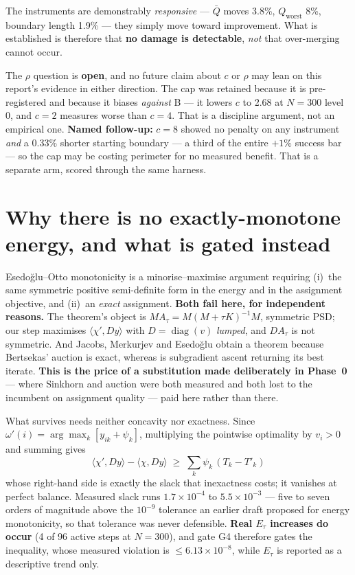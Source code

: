 \documentclass[11pt,a4paper]{article}
\begin{document}
The instruments are demonstrably \emph{responsive} --- \(\bar{Q}\) moves 3.8\%,
\(Q_{\mathrm{worst}}\) 8\%, boundary length 1.9\% --- they simply move toward
improvement. What is established is therefore that \textbf{no damage is
detectable}, \emph{not} that over-merging cannot occur.

\begin{tcolorbox}[colback=yellow!6!white, colframe=orange!60!black,
                  title={Standing limit}, fontupper=\small]
The \(\rho\) question is \textbf{open}, and no future claim about \(c\) or \(\rho\)
may lean on this report's evidence in either direction. The cap was retained
because it is pre-registered and because it biases \emph{against} B --- it lowers
\(c\) to 2.68 at \(N{=}300\) level 0, and \(c{=}2\) measures worse than \(c{=}4\).
That is a discipline argument, not an empirical one. \textbf{Named follow-up:}
\(c{=}8\) showed no penalty on any instrument \emph{and} a \(0.33\%\) shorter
starting boundary --- a third of the entire \(+1\%\) success bar --- so the cap may
be costing perimeter for no measured benefit. That is a separate arm, scored
through the same harness.
\end{tcolorbox}

\section{Why there is no exactly-monotone energy, and what is gated instead}
\label{sec:descent}

Esedo\u{g}lu--Otto monotonicity is a minorise--maximise argument requiring (i)~the
same symmetric positive semi-definite form in the energy and in the assignment
objective, and (ii)~an \emph{exact} assignment. \textbf{Both fail here, for
independent reasons.} The theorem's object is \(M A_\tau = M(M+\tau K)^{-1}M\),
symmetric PSD; our step maximises \(\langle \chi', D y\rangle\) with
\(D = \operatorname{diag}(v)\) \emph{lumped}, and \(D A_\tau\) is not symmetric.
And Jacobs, Merkurjev and Esedo\u{g}lu obtain a theorem because Bertsekas'
auction is exact,
whereas  is subgradient ascent returning its best
iterate. \textbf{This is the price of a substitution made deliberately in Phase~0}
--- where Sinkhorn \cite{cuturi2013sinkhorn} and auction were both measured and
both lost to the incumbent on assignment quality --- paid here rather than there.

What survives needs neither concavity nor exactness. Since
\(\omega'(i) = \arg\max_k [y_{ik} + \psi_k]\), multiplying the pointwise optimality
by \(v_i > 0\) and summing gives
\[
  \boxed{\ \langle \chi', D y\rangle - \langle \chi, D y\rangle
    \;\ge\; \sum_k \psi_k\,(T_k - T'_k)\ }
\]
whose right-hand side is exactly the slack that inexactness costs; it vanishes at
perfect balance. Measured slack runs \(1.7\times10^{-4}\) to
\(5.5\times10^{-3}\) --- five to seven orders of magnitude above the
\(10^{-9}\) tolerance an earlier draft proposed for energy monotonicity, so that
tolerance was never defensible. \textbf{Real \(E_\tau\) increases do occur} (4 of
96 active steps at \(N{=}300\)), and gate G4 therefore gates the inequality, whose
measured violation is \(\le 6.13\times 10^{-8}\), while \(E_\tau\) is reported as a
descriptive trend only.
\end{document}
